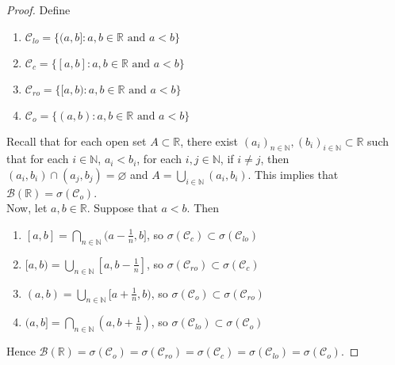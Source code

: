 \documentclass[12pt]{amsart}
\newcommand{\sig}{\sigma}
\newcommand{\N}{\mathbb{N}}
\newcommand{\R}{\mathbb{R}}
\newcommand{\MC}{\mathcal{C}}
\newcommand{\MB}{\mathcal{B}}
\begin{document}
\begin{proof}
Define 
\begin{enumerate}
\item $\MC_{lo} = \{(a,b]:a,b \in \R \text{ and } a<b\}$\\
\item $\MC_{c} = \{[a,b]:a,b \in \R \text{ and } a<b\}$\\
\item $\MC_{ro} = \{[a,b):a,b \in \R \text{ and } a<b\}$\\
\item $\MC_{o} = \{(a,b):a,b \in \R \text{ and } a<b\}$\\
\end{enumerate} 
Recall that for each open set $A \subset \R$, there exist $(a_i)_{n \in \N}, (b_i)_{i \in \N} \subset \R$ such that for each $i \in \N$, $a_i < b_i$, for each $i,j \in \N$, if $i \neq j$, then $(a_i,b_i) \cap (a_j, b_j) = \varnothing$ and $A = \bigcup\limits_{i \in \N}(a_i, b_i)$. This implies that $\MB(\R) = \sig(\MC_o)$. \vspace{2mm}\\
Now, let $a,b \in \R$. Suppose that $a<b$. Then 
\begin{enumerate}
\item $[a,b] = \bigcap\limits_{n \in \N}(a- \frac{1}{n}, b]$, so $\sig(\MC_{c}) \subset \sig(\MC_{lo})$\\
\item $[a,b) = \bigcup\limits_{n \in \N} [a,b-\frac{1}{n}]$, so $\sig(\MC_{ro}) \subset \sig(\MC_{c})$ \\
\item $(a,b) = \bigcup\limits_{n \in \N} [a+\frac{1}{n},b)$, so $\sig(\MC_{o}) \subset \sig(\MC_{ro})$\\
\item $(a,b] = \bigcap\limits_{n \in \N} (a,b+\frac{1}{n})$, so $\sig(\MC_{lo}) \subset \sig(\MC_{o})$\\
\end{enumerate}
Hence $\MB(\R) = \sig(\MC_o) = \sig(\MC_{ro}) = \sig(\MC_{c}) = \sig(\MC_{lo}) = \sig(\MC_{o})$. 
\end{proof}
\end{document}
